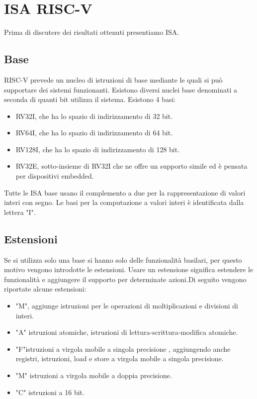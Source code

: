\documentclass[12pt,a4paper]{report}
\begin{document}
% 
\chapter{ISA RISC-V}
Prima di discutere dei risultati ottenuti presentiamo ISA. 
\section{Base}
RISC-V prevede un nucleo di istruzioni di base mediante le quali si può supportare dei sistemi funzionanti. Esistono diversi nuclei base denominati a seconda di quanti bit utilizza il sistema.  Esistono 4 basi:
\begin{itemize}
	\item RV32I, che ha lo spazio di indirizzamento di 32 bit.  
	\item RV64I, che ha lo spazio di indirizzamento di 64 bit.
	\item RV128I, che ha lo spazio di indirizzamento di 128 bit.
	\item RV32E,  sotto-insieme di RV32I che ne offre un supporto simile ed è pensata  per dispositivi embedded.
\end{itemize}
Tutte le ISA base usano il complemento a due per la rappresentazione di valori interi con segno.  Le basi per la computazione a valori interi è identificata dalla lettera "I". 

\section{Estensioni}
Se si utilizza solo una base si hanno solo delle funzionalità basilari, per questo motivo vengono introdotte le estensioni. Usare un estensione significa estendere le funzionalità e aggiungere il supporto per determinate azioni.Di seguito vengono riportate alcune estensioni:
\begin{itemize}
		\item "M", aggiunge istruzioni per le operazioni di moltiplicazioni e divisioni di interi.
		\item "A" istruzioni atomiche,  istruzioni di lettura-scrittura-modifica atomiche. %
		\item "F"istruzioni a virgola mobile a singola precisione , aggiungendo anche registri, istruzioni, load e store a virgola mobile a singola precisione.
		\item "M" istruzioni a virgola mobile a doppia precisione.
		\item "C" istruzioni a 16 bit.
\end{itemize}
\end{document}
